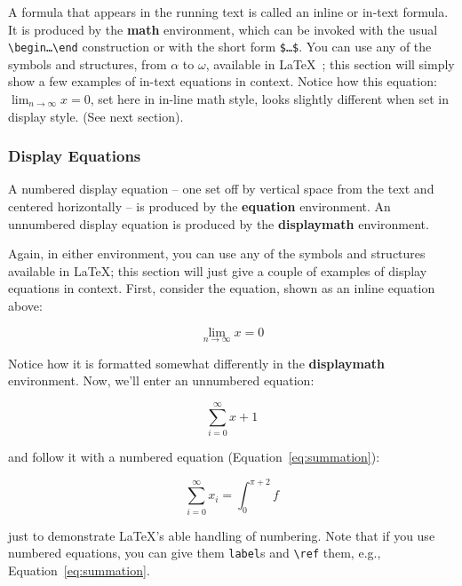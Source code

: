 \documentclass{sig-alternate}
\begin{document}
A formula that appears in the running text is called an
inline or in-text formula.  It is produced by the
\textbf{math} environment, which can be
invoked with the usual \texttt{\textbackslash begin\ldots\textbackslash end}
construction or with the short form \texttt{\$\ldots \$}. You
can use any of the symbols and structures,
from $\alpha$ to $\omega$, available in
\LaTeX~\cite{Lamport:LaTeX}; this section will simply show a
few examples of in-text equations in context. Notice how
this equation: \begin{math}\lim_{n\rightarrow \infty}x=0\end{math},
set here in in-line math style, looks slightly different when
set in display style.  (See next section).

\subsubsection{Display Equations}
\label{sec:displayEquations}

A numbered display equation -- one set off by vertical space
from the text and centered horizontally -- is produced
by the \textbf{equation} environment. An unnumbered display
equation is produced by the \textbf{displaymath} environment.

Again, in either environment, you can use any of the symbols
and structures available in \LaTeX; this section will just
give a couple of examples of display equations in context.
First, consider the equation, shown as an inline equation above:

\begin{equation*}
\lim_{n\rightarrow \infty}x=0
\end{equation*}

Notice how it is formatted somewhat differently in
the \textbf{displaymath}
environment.  Now, we'll enter an unnumbered equation:

\begin{displaymath}
	\sum_{i=0}^{\infty} x + 1
\end{displaymath}

and follow it with a numbered equation (Equation~\ref{eq:summation}):

\begin{equation}
	\sum_{i=0}^{\infty}x_i=\int_{0}^{\pi+2} f
\label{eq:summation}
\end{equation}

just to demonstrate \LaTeX's able handling of numbering.
Note that if you use numbered equations, you can give them \texttt{label}s
and \texttt{\textbackslash ref} them, e.g., Equation~\ref{eq:summation}.
\end{document}
